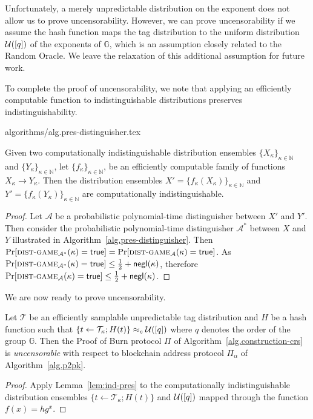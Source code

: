 Unfortunately, a merely unpredictable distribution on the exponent does not allow us to prove uncensorability. However, we can prove uncensorability if we assume the hash function maps the tag distribution to the uniform distribution $\mathcal{U}([q])$ of the exponents of $\mathbb{G}$, which is an assumption closely related to the Random Oracle. We leave the relaxation of this additional assumption for future work.

To complete the proof of uncensorability, we note that applying an efficiently computable function to indistinguishable distributions preserves indistinguishability.

{algorithms/alg.pres-distinguisher.tex}

\begin{lemma}\label{lem:ind-pres}
  Given two
  computationally indistinguishable distribution ensembles
  $\{X_\kappa\}_{\kappa\in\mathbb{N}}$ and $\{Y_\kappa\}_{\kappa\in\mathbb{N}}$,
  let
  $\{f_\kappa\}_{\kappa\in\mathbb{N}}$,
  be an efficiently computable family of functions $X_\kappa \longrightarrow Y_\kappa$.
  Then the distribution ensembles
  $X' = \{f_\kappa(X_\kappa)\}_{\kappa\in\mathbb{N}}$
  and
  $Y' = \{f_\kappa(Y_\kappa)\}_{\kappa\in\mathbb{N}}$
  are computationally indistinguishable.
\end{lemma}
\begin{proof}
  Let $\mathcal{A}$ be a probabilistic polynomial-time distinguisher
  between $X'$ and $Y'$. Then consider the probabilistic polynomial-time distinguisher $\mathcal{A}^*$ between $X$ and $Y$ illustrated in Algorithm~\ref{alg.pres-distinguisher}. Then
  $\Pr[\textsc{dist}\-\text{-}\-\textsc{game}_{\mathcal{A}^*}(\kappa) = \mathsf{true}] =
   \Pr[\textsc{dist}\-\text{-}\-\textsc{game}_{\mathcal{A}}(\kappa) = \mathsf{true}]$.
  As $\Pr[\textsc{dist}\-\text{-}\-\textsc{game}_{\mathcal{A}^*}(\kappa) = \mathsf{true}] \leq \frac{1}{2} + \textsf{negl}(\kappa)$, therefore $\Pr[\textsc{dist}\-\text{-}\-\textsc{game}_{\mathcal{A}}(\kappa) = \mathsf{true}] \leq \frac{1}{2} + \textsf{negl}(\kappa)$.
\end{proof}

We are now ready to prove uncensorability.

\begin{theorem}[Uncensorability]
  Let $\mathcal{T}$ be an efficiently samplable unpredictable tag distribution and $H$ be a hash function such that $\{t \gets \mathcal{T}_\kappa; H(t)\} \approx_c \mathcal{U}([q])$ where $q$ denotes the order of the group $\mathbb{G}$. Then the Proof of Burn protocol $\Pi$ of Algorithm~\ref{alg.construction-crs} is \emph{uncensorable} with respect to blockchain address protocol $\Pi_\alpha$ of Algorithm~\ref{alg.p2pk}.
\end{theorem}
\begin{proof}
  Apply Lemma~\ref{lem:ind-pres} to the computationally indistinguishable distribution ensembles $\{t \gets \mathcal{T}_\kappa; H(t)\}$ and $\mathcal{U}([q])$ mapped through the function $f(x) = h g^x$.
\end{proof}

